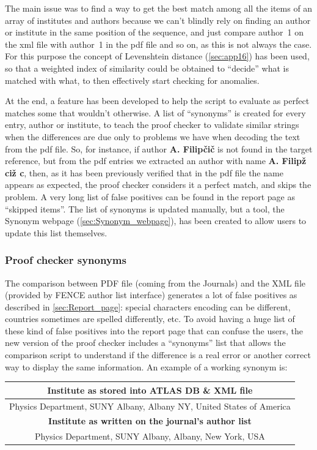 The main issue was to find a way to get the best match among all the items of an array of institutes and authors because we can’t blindly rely on finding an author or institute in the same position of the sequence, and just compare author~1 on the xml file with author~1 in the pdf file and so on, as this is not always the case. For this purpose the concept of Levenshtein distance (\ref{sec:app16}) has been used, so that a weighted index of similarity could be obtained to “decide” what is matched with what, to then effectively start checking for anomalies.

At the end, a feature has been developed to help the script to evaluate as perfect matches some that wouldn’t otherwise. A list of “synonyms” is created for every entry, author or institute, to teach the proof checker to validate similar strings when the differences are due only to problems we have when decoding the text from the pdf file. So, for instance, if author \textbf{A. Filipčič} is not found in the target reference, but from the pdf entries we extracted an author with name \textbf{A. Filipž ciž c}, then, as it has been previously verified that in the pdf file the name appears as expected, the proof checker considers it a perfect match, and skips the problem. A very long list of false positives can be found in the report page as “skipped items”. The list of synonyms is updated manually, but a tool, the Synonym webpage (\ref{sec:Synonym_webpage}), has been created to allow users to update this list themselves.


\subsubsection{Proof checker synonyms}
\label{sec:Proof_checker_synonyms}
The comparison between PDF file (coming from the Journals) and the XML file (provided by FENCE author list interface) generates a lot of false positives as described in \ref{sec:Report_page}: special characters encoding can be different, countries sometimes are spelled differently, etc. To avoid having a huge list of these kind of false positives into the report page that can confuse the users, the new version of the proof checker includes a “synonyms” list that allows the comparison script to understand if the difference is a real error or another correct way to display the same information. An example of a working synonym is:
\begin{table}[ht!]
\centering
\begin{tabular}{|c|}
\hline
\textbf{Institute as stored into ATLAS DB \& XML file} \\
\hline
Physics Department, SUNY Albany, Albany NY, United States of America \\
\hline
\textbf{Institute as written on the journal’s author list} \\
\hline
Physics Department, SUNY Albany, Albany, New York, USA \\
\hline
\end{tabular}
\end{table}

